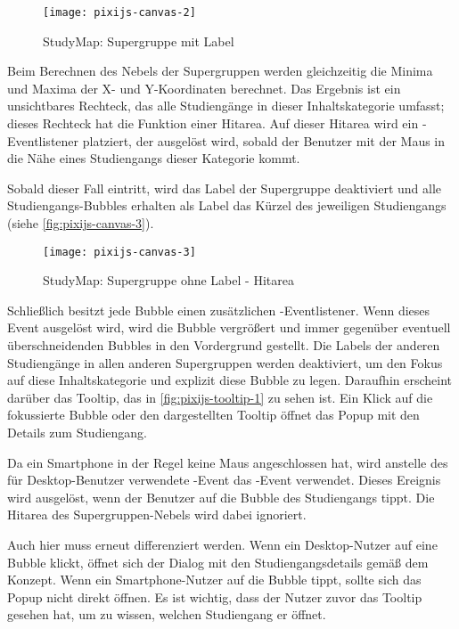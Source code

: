 \begin{figure}[H]
    \centering
    \texttt{[image: pixijs-canvas-2]}
    \caption{StudyMap: Supergruppe mit Label}
    \label{fig:pixijs-canvas-2}
\end{figure}

Beim Berechnen des Nebels der Supergruppen werden gleichzeitig die Minima und Maxima der X- und Y-Koordinaten berechnet. Das Ergebnis ist ein unsichtbares Rechteck, das alle Studiengänge in dieser Inhaltskategorie umfasst; dieses Rechteck hat die Funktion einer Hitarea. Auf dieser Hitarea wird ein -Eventlistener platziert, der ausgelöst wird, sobald der Benutzer mit der Maus in die Nähe eines Studiengangs dieser Kategorie kommt.

Sobald dieser Fall eintritt, wird das Label der Supergruppe deaktiviert und alle Studiengangs-Bubbles erhalten als Label das Kürzel des jeweiligen Studiengangs (siehe \autoref{fig:pixijs-canvas-3}).

\begin{figure}[H]
    \centering
    \texttt{[image: pixijs-canvas-3]}
    \caption{StudyMap: Supergruppe ohne Label - Hitarea}
    \label{fig:pixijs-canvas-3}
\end{figure}

Schließlich besitzt jede Bubble einen zusätzlichen -Eventlistener. Wenn dieses Event ausgelöst wird, wird die Bubble vergrößert und immer gegenüber eventuell überschneidenden Bubbles in den Vordergrund gestellt. Die Labels der anderen Studiengänge in allen anderen Supergruppen werden deaktiviert, um den Fokus auf diese Inhaltskategorie und explizit diese Bubble zu legen. Daraufhin erscheint darüber das Tooltip, das in \autoref{fig:pixijs-tooltip-1} zu sehen ist. Ein Klick auf die fokussierte Bubble oder den dargestellten Tooltip öffnet das Popup mit den Details zum Studiengang.

Da ein Smartphone in der Regel keine Maus angeschlossen hat, wird anstelle des für Desktop-Benutzer verwendete -Event das -Event verwendet. Dieses Ereignis wird ausgelöst, wenn der Benutzer auf die Bubble des Studiengangs tippt. Die Hitarea des Supergruppen-Nebels wird dabei ignoriert.

Auch hier muss erneut differenziert werden. Wenn ein Desktop-Nutzer auf eine Bubble klickt, öffnet sich der Dialog mit den Studiengangsdetails gemäß dem Konzept. Wenn ein Smartphone-Nutzer auf die Bubble tippt, sollte sich das Popup nicht direkt öffnen. Es ist wichtig, dass der Nutzer zuvor das Tooltip gesehen hat, um zu wissen, welchen Studiengang er öffnet.

